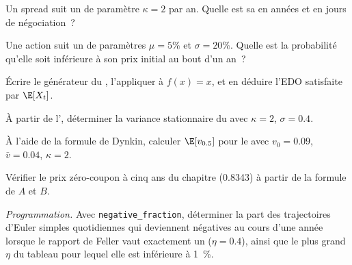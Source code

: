 \begin{exercise}[$\star$]\label{exo:qm:stochastic-differential-equations:1}
Un spread suit un  de paramètre $\kappa = 2$ par an. Quelle est sa 
en années et en jours de négociation~?
\end{exercise}

\begin{exercise}[$\star$]\label{exo:qm:stochastic-differential-equations:2}
Une action suit un  de paramètres $\mu = 5\%$ et $\sigma = 20\%$. Quelle est la probabilité
qu'elle soit inférieure à son prix initial au bout d'un an~?
\end{exercise}

\begin{exercise}[$\star$]\label{exo:qm:stochastic-differential-equations:3}
Écrire le générateur du , l'appliquer à $f(x) = x$, et en déduire l'EDO
satisfaite par $\E[X_t]$.
\end{exercise}

\begin{exercise}[$\star\star$]\label{exo:qm:stochastic-differential-equations:4}
À partir de l', déterminer la variance stationnaire du  avec $\kappa = 2$, $\sigma = 0.4$.
\end{exercise}

\begin{exercise}[$\star\star$]\label{exo:qm:stochastic-differential-equations:5}
À l'aide de la formule de Dynkin, calculer $\E[v_{0.5}]$ pour le  avec $v_0 = 0.09$, $\bar v =
0.04$, $\kappa = 2$.
\end{exercise}

\begin{exercise}[$\star\star$]\label{exo:qm:stochastic-differential-equations:6}
Vérifier le prix zéro-coupon à cinq ans du chapitre (0.8343) à partir de la formule de $A$ et $B$.
\end{exercise}

\begin{exercise}[$\star\star\star$]\label{exo:qm:stochastic-differential-equations:7}
\emph{Programmation.} Avec \texttt{negative\_fraction}, déterminer la part des trajectoires d'Euler simples quotidiennes qui
deviennent négatives au cours d'une année lorsque le rapport de Feller vaut exactement un ($\eta = 0.4$), ainsi que le plus grand $\eta$ du
tableau pour lequel elle est inférieure à 1~\%.
\end{exercise}

